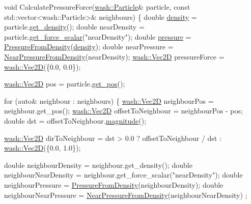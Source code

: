 \begin{DoxyCode}
\textcolor{keywordtype}{void} CalculatePressureForce(\mbox{\hyperlink{classwash_1_1Particle}{wash::Particle}}& particle, \textcolor{keyword}{const} std::vector<wash::Particle>& 
      neighbours) \{
    \textcolor{keywordtype}{double} \mbox{\hyperlink{3d__fluid__sim_2fluid__sim_8cpp_a140d94d7edb97c062961056d1926a2db}{density}} = particle.\mbox{\hyperlink{classwash_1_1Particle_a8c0ce3f48b189fd8550c3bfab17eec68}{get\_density}}();
    \textcolor{keywordtype}{double} nearDensity = particle.\mbox{\hyperlink{classwash_1_1Particle_ab42a162b41a4e8cf6212bd9c43f3a0cf}{get\_force\_scalar}}(\textcolor{stringliteral}{"nearDensity"});
    \textcolor{keywordtype}{double} \mbox{\hyperlink{3d__fluid__sim_2fluid__sim_8cpp_a35ac7259c74fa75da5dc982febe230c0}{pressure}} = \mbox{\hyperlink{ca__fluid__sim_2fluid__sim_8cpp_ae242b1d4df1d0d56aea2c284de9c52d5}{PressureFromDensity}}(\mbox{\hyperlink{3d__fluid__sim_2fluid__sim_8cpp_a140d94d7edb97c062961056d1926a2db}{density}});
    \textcolor{keywordtype}{double} nearPressure = \mbox{\hyperlink{ca__fluid__sim_2fluid__sim_8cpp_a2d6d90830304d956a1b7880aafc425a3}{NearPressureFromDensity}}(nearDensity);
    \mbox{\hyperlink{classwash_1_1Vec}{wash::Vec2D}} pressureForce = \mbox{\hyperlink{namespacewash_a905f2d902fc7aaab0e8a58b6ee25baf1}{wash::Vec2D}}(\{0.0, 0.0\});

    \mbox{\hyperlink{classwash_1_1Vec}{wash::Vec2D}} pos = particle.\mbox{\hyperlink{classwash_1_1Particle_a9d222d453d640cf629ee8dfbee6b43c2}{get\_pos}}();

    \textcolor{keywordflow}{for} (\textcolor{keyword}{auto}& neighbour : neighbours) \{
        \mbox{\hyperlink{classwash_1_1Vec}{wash::Vec2D}} neighbourPos = neighbour.get\_pos();
        \mbox{\hyperlink{classwash_1_1Vec}{wash::Vec2D}} offsetToNeighbour = neighbourPos - pos;
        \textcolor{keywordtype}{double} dst = offsetToNeighbour.\mbox{\hyperlink{classwash_1_1Vec_a41de499daf12160b2cf515ce0c9da70f}{magnitude}}();

        \mbox{\hyperlink{classwash_1_1Vec}{wash::Vec2D}} dirToNeighbour = dst > 0.0 ? offsetToNeighbour / dst : 
      \mbox{\hyperlink{namespacewash_a905f2d902fc7aaab0e8a58b6ee25baf1}{wash::Vec2D}}(\{0.0, 1.0\});

        \textcolor{keywordtype}{double} neighbourDensity = neighbour.get\_density();
        \textcolor{keywordtype}{double} neighbourNearDensity = neighbour.get\_force\_scalar(\textcolor{stringliteral}{"nearDensity"});
        \textcolor{keywordtype}{double} neighbourPressure = \mbox{\hyperlink{ca__fluid__sim_2fluid__sim_8cpp_ae242b1d4df1d0d56aea2c284de9c52d5}{PressureFromDensity}}(neighbourDensity);
        \textcolor{keywordtype}{double} neighbourNearPressure = \mbox{\hyperlink{ca__fluid__sim_2fluid__sim_8cpp_a2d6d90830304d956a1b7880aafc425a3}{NearPressureFromDensity}}(neighbourNearDensity)
      ;


\end{DoxyCode}
